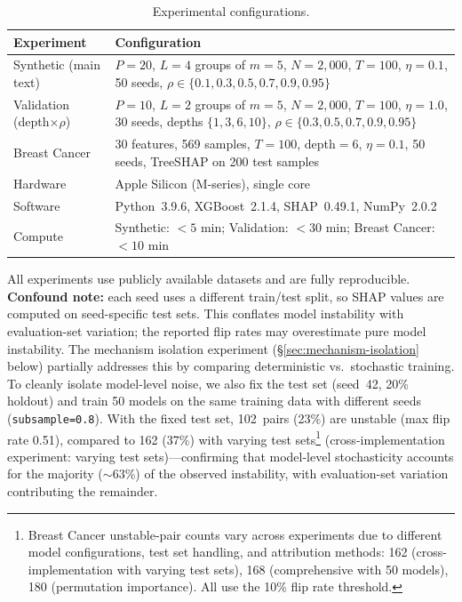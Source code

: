 \documentclass{article}
\begin{document}
\begin{table}[t]
\centering
\caption{Experimental configurations.}
\small
\begin{tabular}{@{}lp{10cm}@{}}
\toprule
Experiment & Configuration \\
\midrule
Synthetic (main text) & $P{=}20$, $L{=}4$ groups of $m{=}5$, $N{=}2{,}000$, $T{=}100$, $\eta{=}0.1$, 50 seeds, $\rho \in \{0.1, 0.3, 0.5, 0.7, 0.9, 0.95\}$ \\
Validation (depth$\times\rho$) & $P{=}10$, $L{=}2$ groups of $m{=}5$, $N{=}2{,}000$, $T{=}100$, $\eta{=}1.0$, 30 seeds, depths $\{1,3,6,10\}$, $\rho \in \{0.3, 0.5, 0.7, 0.9, 0.95\}$ \\
Breast Cancer & 30 features, 569 samples, $T{=}100$, depth${=}6$, $\eta{=}0.1$, 50 seeds, TreeSHAP on 200 test samples \\
\midrule
Hardware & Apple Silicon (M-series), single core \\
Software & Python~3.9.6, XGBoost~2.1.4, SHAP~0.49.1, NumPy~2.0.2 \\
Compute & Synthetic: ${<}5$ min; Validation: ${<}30$ min; Breast Cancer: ${<}10$ min \\
\bottomrule
\end{tabular}
\end{table}

\begin{sloppypar}
All experiments use publicly available datasets and are fully reproducible.
\textbf{Confound note:} each seed uses a different train/test split, so SHAP values
are computed on seed-specific test sets. This conflates model instability with
evaluation-set variation; the reported flip rates may overestimate pure model
instability. The mechanism isolation experiment (\S\ref{sec:mechanism-isolation}
below) partially addresses this by comparing deterministic vs.\ stochastic training.
To cleanly isolate model-level noise, we also fix the test set (seed~42, 20\%
holdout) and train 50 models on the same training data with different seeds
(\texttt{subsample=0.8}). With the fixed test set, 102~pairs (23\%) are unstable
(max flip rate 0.51), compared to 162 (37\%) with varying test sets\footnote{Breast Cancer unstable-pair counts vary across experiments due to different model configurations, test set handling, and attribution methods: 162 (cross-implementation with varying test sets), 168 (comprehensive with 50 models), 180 (permutation importance). All use the 10\% flip rate threshold.} (cross-implementation experiment: varying test sets)---confirming that
model-level stochasticity accounts for the majority (${\sim}63\%$) of the observed
instability, with evaluation-set variation contributing the remainder.
\end{sloppypar}
\end{document}
